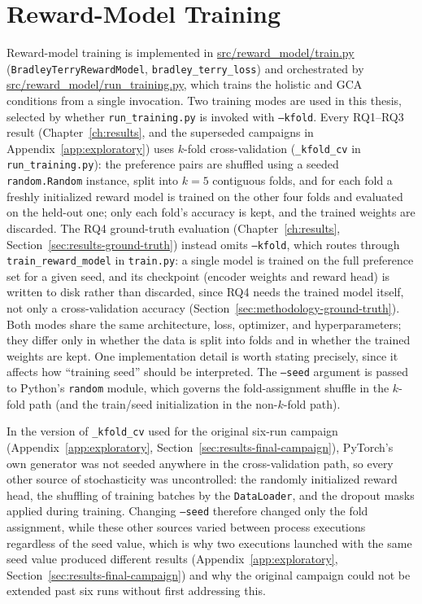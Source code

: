 \section{Reward-Model Training}
\label{sec:impl-rm-training}

Reward-model training is implemented in \url{src/reward_model/train.py}
(\texttt{BradleyTerryRewardModel}, \texttt{bradley\_terry\_loss}) and orchestrated
by \url{src/reward_model/run_training.py}, which trains the holistic and GCA
conditions from a single invocation. Two training modes are used in this thesis,
selected by whether \texttt{run\_training.py} is invoked with \texttt{--kfold}.
Every RQ1--RQ3 result (Chapter~\ref{ch:results}, and the superseded campaigns
in Appendix~\ref{app:exploratory}) uses $k$-fold cross-validation
(\texttt{\_kfold\_cv} in \texttt{run\_training.py}): the preference pairs are
shuffled using a seeded \texttt{random.Random} instance, split into $k=5$
contiguous folds, and for each fold a freshly initialized reward model is trained
on the other four folds and evaluated on the held-out one; only each fold's
accuracy is kept, and the trained weights are discarded. The RQ4 ground-truth
evaluation (Chapter~\ref{ch:results}, Section~\ref{sec:results-ground-truth})
instead omits \texttt{--kfold}, which routes through
\texttt{train\_reward\_model} in \texttt{train.py}: a single model is trained on
the full preference set for a given seed, and its checkpoint (encoder weights and
reward head) is written to disk rather than discarded, since RQ4 needs the
trained model itself, not only a cross-validation accuracy
(Section~\ref{sec:methodology-ground-truth}). Both modes share the same
architecture, loss, optimizer, and hyperparameters; they differ only in whether
the data is split into folds and in whether the trained weights are kept. One
implementation
detail is worth stating precisely, since it affects how ``training seed'' should
be interpreted. The \texttt{--seed} argument is passed to Python's
\texttt{random} module, which governs the fold-assignment shuffle in the
$k$-fold path (and the train/seed initialization in the non-$k$-fold path).

In the version of \texttt{\_kfold\_cv} used for the original six-run campaign
(Appendix~\ref{app:exploratory}, Section~\ref{sec:results-final-campaign}),
PyTorch's own generator was not seeded anywhere in the cross-validation path,
so every other source of stochasticity was uncontrolled: the randomly
initialized reward head, the shuffling of training batches by the
\texttt{DataLoader}, and the dropout masks applied during training. Changing
\texttt{--seed} therefore changed only the fold assignment, while these other
sources varied between process executions regardless of the seed value, which
is why two executions launched with the same seed value produced different
results (Appendix~\ref{app:exploratory},
Section~\ref{sec:results-final-campaign}) and why the original
campaign could not be extended past six runs without first addressing this.

